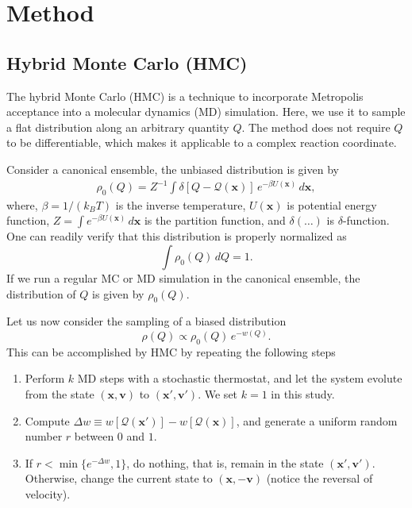 \documentclass{article}
\newcommand{\vct}[1]{\mathbf{#1}}
\newcommand{\vx}{\vct{x}}
\newcommand{\vv}{\vct{v}}
\newcommand{\Q}{\mathcal{Q}}
\begin{document}
\section{Method}

\subsection{Hybrid Monte Carlo (HMC)}



The hybrid Monte Carlo (HMC)
is a technique to incorporate Metropolis acceptance
into a molecular dynamics (MD) simulation.
%
Here, we use it to sample a flat distribution
along an arbitrary quantity $Q$.
%
The method
does not require $Q$ to be differentiable,
which makes it applicable to
a complex reaction coordinate.

Consider a canonical ensemble,
the unbiased distribution
is given by
\begin{align}
  \rho_0(Q)
=
  Z^{-1} \int \delta[Q - \Q(\vx)] \, e^{-\beta U(\vx)} \, d\vx,
\end{align}
where,
$\beta = 1/(k_B T)$ is the inverse temperature,
$U(\vx)$ is potential energy function,
$Z = \int e^{-\beta U(\vx)} \, d\vx$ is the partition function,
and $\delta(\dots)$ is $\delta$-function.
%
One can readily verify that this distribution is properly normalized as
\[
  \int \rho_0(Q) \, dQ = 1.
\]
%
If we run a regular MC or MD simulation in the canonical ensemble,
the distribution of $Q$ is given by $\rho_0(Q)$.

Let us now consider the sampling of a biased distribution
\begin{equation}
  \rho(Q) \propto \rho_0(Q) \, e^{-w(Q)}.
\label{eq:rhoQbiased}
\end{equation}
This can be accomplished by HMC by repeating the following steps
\begin{enumerate}
  \item Perform $k$ MD steps with a stochastic thermostat,
        and let the system evolute
        from the state $(\vx, \vv)$ to $(\vx', \vv')$.
        We set $k = 1$ in this study.

  \item Compute $\Delta w \equiv w[\Q(\vx')] - w[\Q(\vx)]$,
        and generate a uniform random number $r$ between $0$ and $1$.

  \item If $r < \min\{e^{-\Delta w}, 1\}$, do nothing,
        that is, remain in the state $(\vx', \vv')$.
        Otherwise, change the current state to $(\vx, -\vv)$
        (notice the reversal of velocity).
\end{enumerate}
\end{document}
